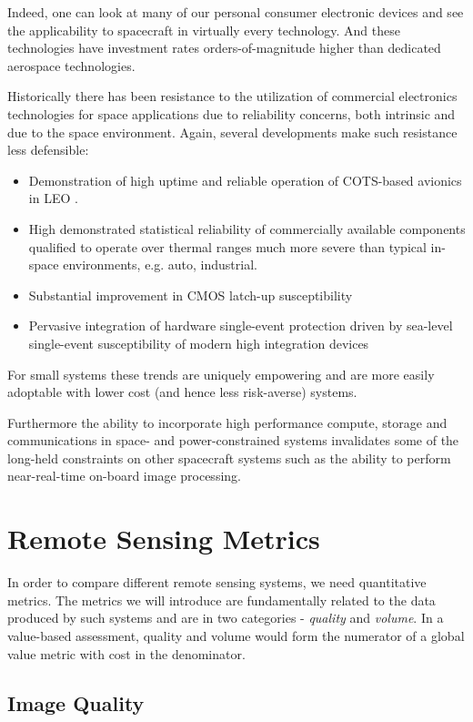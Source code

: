 \documentclass[]{spieman}  %
\begin{document}
Indeed, one can look at many of our personal consumer electronic devices and see the applicability to spacecraft in virtually every technology.  And these technologies have investment rates orders-of-magnitude higher than dedicated aerospace technologies.

Historically there has been resistance to the utilization of commercial electronics technologies for space applications due to reliability concerns, both intrinsic and due to the space environment.  Again, several developments make such resistance less defensible:

\begin{itemize}
    \item Demonstration of high uptime and reliable operation of COTS-based avionics in LEO \cite{careful_cots}.
    \item High demonstrated statistical reliability of commercially available components qualified to operate over thermal ranges much more severe than typical in-space environments, e.g. auto, industrial.
    \item Substantial improvement in CMOS latch-up susceptibility
    \item Pervasive integration of hardware single-event protection driven by sea-level single-event susceptibility of modern high integration devices
\end{itemize}

For small systems these trends are uniquely empowering and are more easily adoptable with lower cost (and hence less risk-averse) systems.  

Furthermore the ability to incorporate high performance compute, storage and communications in space- and power-constrained systems invalidates some of the long-held constraints on other spacecraft systems such as the ability to perform near-real-time on-board image processing.

\section{Remote Sensing Metrics}
\label{sec:Metrics}
In order to compare different remote sensing systems, we need quantitative metrics.  The metrics we will introduce are fundamentally related to the data produced by such systems and are in two categories - \emph{quality} and \emph{volume}.  In a value-based assessment, quality and volume would form the numerator of a global value metric with cost in the denominator.

\subsection{Image Quality}
\label{sec:iq}
\end{document}
